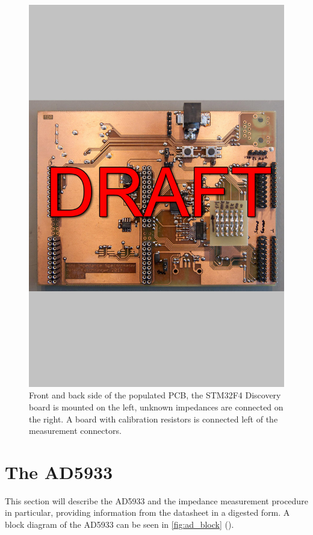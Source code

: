 \begin{figure}[htpb]
  \centering
    \includegraphics[width=\textwidth]{bilder/pcb_frontback.jpg}
  \caption{Front and back side of the populated PCB, the STM32F4 Discovery board is mounted on the left, unknown
    impedances are connected on the right. A board with calibration resistors is connected left of the measurement
    connectors.}
  \label{fig:pcb_frontback}
\end{figure}


\section{The AD5933}

This section will describe the AD5933 and the impedance measurement procedure in particular, providing information
from the datasheet\footnotemark{} in a digested form.
A block diagram of the AD5933 can be seen in \autoref{fig:ad_block} ().

